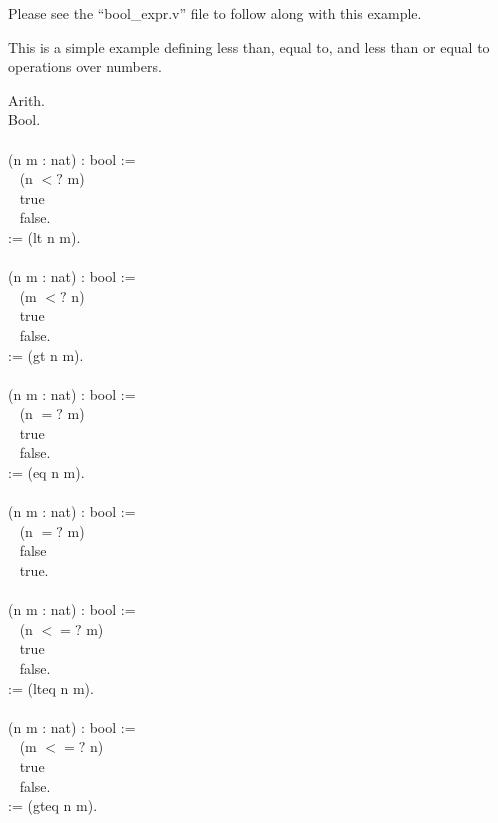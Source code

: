 
Please see the ``bool\_expr.v'' file to follow along with this example. 

\noindent 
This is a simple example defining less than, equal to, and less than or equal to operations over numbers.

\begin{code}
	 Arith.	\\
	\Load Bool.
	\\ \\
	\Definition {} (n m : nat) : bool :=		\\ \-\ \qquad
		  \If (n $<?$ m)					\\ \-\ \qquad
		  \Then true					\\ \-\ \qquad
		  \Else false.					\\
	\Notation {} := (lt n m).
	\\ \\
	\Definition {} (n m : nat) : bool :=	\\ \-\ \qquad
		  \If (m $<?$ n)					\\ \-\ \qquad
		  \Then true					\\ \-\ \qquad
		  \Else false.					\\
	\Notation {} := (gt n m).
	\\ \\
	\Definition {} (n m : nat) : bool :=	\\ \-\ \qquad
		  \If (n $=?$ m)					\\ \-\ \qquad
		  \Then true					\\ \-\ \qquad
		  \Else false.					\\
	\Notation {} := (eq n m).
	\\ \\
	\Definition {} (n m : nat) : bool :=	\\ \-\ \qquad
		  \If (n $=?$ m)					\\ \-\ \qquad
		  \Then false					\\ \-\ \qquad
		  \Else true.					
	\\ \\
	\Definition {} (n m : nat) : bool :=	\\ \-\ \qquad
		  \If (n $<=?$ m)				\\ \-\ \qquad
		  \Then true					\\ \-\ \qquad
		  \Else false.					\\
	\Notation {} := (lteq n m).					
	\\ \\
	\Definition {} (n m : nat) : bool :=	\\ \-\ \qquad
		  \If (m $<=?$ n)				\\ \-\ \qquad
		  \Then true					\\ \-\ \qquad
		  \Else false.					\\
	\Notation {} := (gteq n m).
\end{code}











